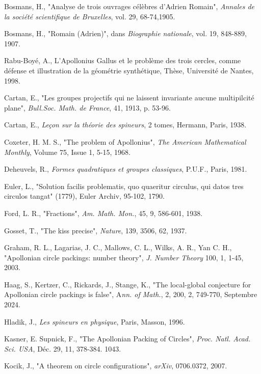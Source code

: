 \documentclass[12pt]{article}
\theoremstyle{définition}
\theoremstyle{remark}
\theoremstyle{plain}
\theoremstyle{plain}
\begin{document}
\begin{thebibliography}{}
 Bosmans, H., "Analyse de trois ouvrages célèbres d'Adrien Romain", { \it Annales de la soci\'{e}t\'{e} scientifique de Bruxelles}, vol. 29, 68-74,1905. 

 Bosmans, H., "Romain (Adrien)", dans {\it Biographie nationale}, vol. 19, 848-889, 1907.

 Rabu-Boyé, A., L'Apollonius Gallus et le problème des trois cercles, comme défense et illustration de la géométrie synthétique, Thèse, Université de Nantes, 1998.

 Cartan, E., "Les groupes projectifs qui ne laissent invariante aucune multipilcité plane", {\it Bull.Soc. Math. de France}, 41, 1913, p. 53-96.

 Cartan, E., {\it Leçon sur la théorie des spineurs}, 2 tomes, Hermann, Paris, 1938.

 Coxeter, H. M. S., "The problem of Apollonius", {\it The American Mathematical Monthly},
Volume 75, Issue 1, 5-15, 1968.

 Deheuvels, R., {\it Formes quadratiques et groupes classiques}, P.U.F., Paris, 1981.

 Euler, L., "Solution facilis problematis, quo quaeritur circulus, qui datos tres circulos tangat" (1779), Euler Archiv, 95-102, 1790.

 Ford, L. R., "Fractions", {\it Am. Math. Mon.}, 45, 9, 586-601, 1938.

 Gosset, T., "The kiss precise", {\it Nature}, 139, 3506, 62, 1937.

 Graham, R. L., Lagarias, J. C., Mallows, C. L., Wilks, A. R., Yan C. H.,  "Apollonian circle packings: number theory", {\it J. Number Theory}
100, 1, 1-45, 2003.

 Haag, S., Kertzer, C., Rickards, J., Stange, K., "The local-global conjecture for Apollonian circle packings is false", A{\it nn. of Math.}, 2, 200, 2, 749-770, Septembre 2024.

 Hladik, J., {\it Les spineurs en physique}, Paris, Masson, 1996.

 Kasner, E. Supnick, F., "The Apollonian Packing of Circles", {\it Proc. Natl. Acad. Sci. USA}, Déc. 29, 11, 378-384. 1043.

 Kocik, J., "A theorem on circle configurations", {\it arXiv}, 0706.0372, 2007.


\end{thebibliography}
\end{document}

